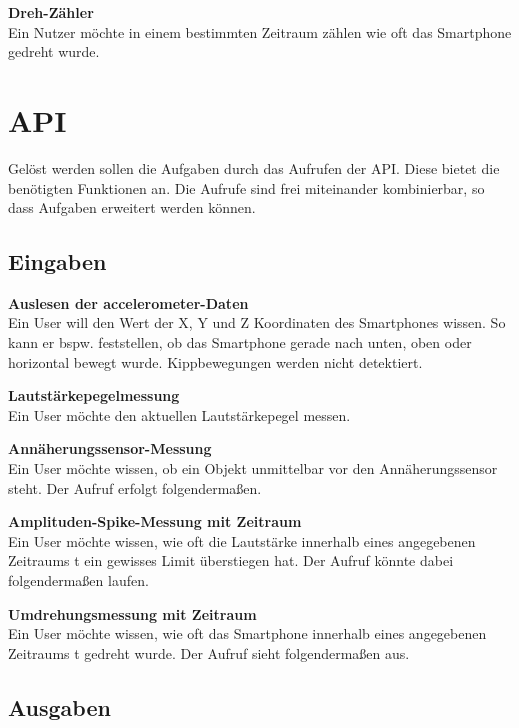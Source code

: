 \documentclass[11pt,a4paper]{report}
\begin{document}
\textbf{Dreh-Zähler}\\
Ein Nutzer möchte in einem bestimmten Zeitraum zählen wie oft das Smartphone gedreht wurde.


\section*{API}\label{sec:API}
Gelöst werden sollen die Aufgaben durch das Aufrufen der API.
Diese bietet die benötigten Funktionen an.
Die Aufrufe sind frei miteinander kombinierbar, so dass Aufgaben erweitert werden können.

\subsection*{Eingaben}

\textbf{Auslesen der accelerometer-Daten}\\
Ein User will den Wert der X, Y und Z Koordinaten des Smartphones wissen.
So kann er bspw. feststellen, ob das Smartphone gerade nach unten, oben oder horizontal bewegt wurde.
Kippbewegungen werden nicht detektiert.


\textbf{Lautstärkepegelmessung}\\
Ein User möchte den aktuellen Lautstärkepegel messen.


\textbf{Annäherungssensor-Messung}\\
Ein User möchte wissen, ob ein Objekt unmittelbar vor den Annäherungssensor steht.
Der Aufruf erfolgt folgendermaßen.


\textbf{Amplituden-Spike-Messung mit Zeitraum}\\
Ein User möchte wissen, wie oft die Lautstärke innerhalb eines angegebenen Zeitraums t ein gewisses Limit überstiegen hat.
Der Aufruf könnte dabei folgendermaßen laufen.



\textbf{Umdrehungsmessung mit Zeitraum}\\
Ein User möchte wissen, wie oft das Smartphone innerhalb eines angegebenen Zeitraums t gedreht wurde.
Der Aufruf sieht folgendermaßen aus.



\subsection*{Ausgaben}\label{subsec:Ausgaben}
\end{document}
